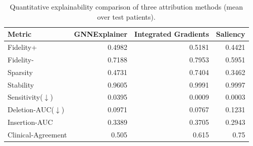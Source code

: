\begin{table}[t]
\centering
\caption{Quantitative explainability comparison of three attribution methods (mean over test patients).}
\label{tab:xai}
\footnotesize
\begin{tabular}{lrrr}
\toprule
Metric & GNNExplainer & Integrated Gradients & Saliency \\
\midrule
Fidelity+ & 0.4982 & 0.5181 & 0.4421 \\
Fidelity- & 0.7188 & 0.7953 & 0.5951 \\
Sparsity & 0.4731 & 0.7404 & 0.3462 \\
Stability & 0.9605 & 0.9991 & 0.9997 \\
Sensitivity($\downarrow$) & 0.0395 & 0.0009 & 0.0003 \\
Deletion-AUC($\downarrow$) & 0.0971 & 0.0767 & 0.1231 \\
Insertion-AUC & 0.3389 & 0.3705 & 0.2943 \\
Clinical-Agreement & 0.505 & 0.615 & 0.75 \\
\bottomrule
\end{tabular}
\end{table}
